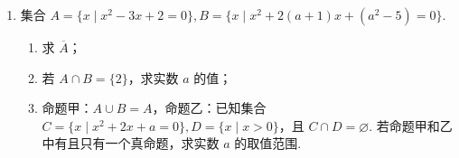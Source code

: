 \documentclass[a4paper,11pt]{article}
\begin{document}
\begin{enumerate}
\ansspace[6]

\item 集合 $A=\{x\mid x^2-3x+2=0\},B=\{x\mid x^2+2(a+1)x+(a^2-5)=0\}$.

\begin{enumerate}[label=(\arabic*)]
\item 求 $\overline A$；
\item 若 $A\cap B=\{2\}$，求实数 $a$ 的值；
\item 命题甲：$A\cup B=A$，命题乙：已知集合 $C=\{x\mid x^2+2x+a=0\},D=\{x\mid x>0\}$，且 $C\cap D=\varnothing$. 若命题甲和乙中有且只有一个真命题，求实数 $a$ 的取值范围.
\end{enumerate}


\end{enumerate}
\end{document}
